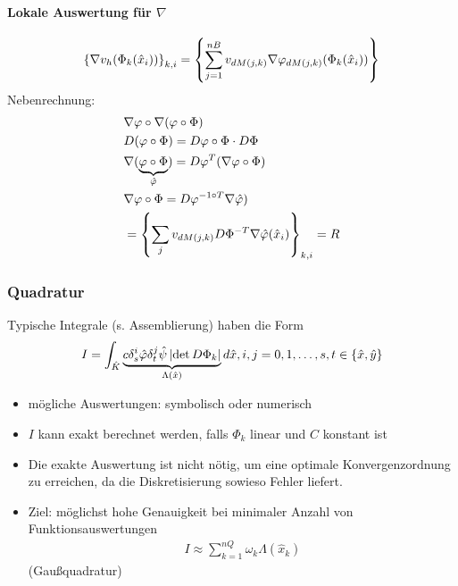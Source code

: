 \paragraph{Lokale Auswertung für $\nabla$}
\begin{align*}
  \left\{ \nabla v_{h}( \Phi_{k}( \hat x_{i})) \right\}_{k, i} = \left\{ \sum_{j = 1}^{nB} v_{dM(j, k)} \nabla \varphi_{dM(j, k)}(\Phi_{k}(\hat x_{i})) \right\}
\end{align*}
Nebenrechnung:
\begin{align*}
&\nabla \varphi \circ \nabla (\varphi \circ \Phi)  \\
&D(\varphi \circ \Phi) = D\varphi \circ \Phi \cdot D\Phi\\
&\nabla(\underbrace{\varphi \circ \Phi}_{\hat {\varphi}}) = D\varphi^{T} (\nabla \varphi \circ \Phi)\\
&\nabla\varphi \circ \Phi = D\varphi^{-1 \circ T} \nabla \hat {\varphi})\\
&= \left\{ \sum_{j} v_{dM(j, k)} D \Phi^{-T} \nabla \hat {\varphi}(\hat x_{i}) \right\}_{k, i} = R
\end{align*}
\subsubsection{Quadratur}
Typische Integrale (s. Assemblierung) haben die Form 
\begin{align*}
  I = \int_{\hat K} \underbrace{c \delta_{s}^{i} \hat {\varphi} \delta_{t}^{j} \hat\psi \left|\det D \Phi_{k}\right|}_{\Lambda(\hat x)} d \hat x, i, j = 0, 1, \dots, s, t \in \left\{ \hat x, \hat y \right\}
\end{align*}
\begin{itemize}
\item mögliche Auswertungen: symbolisch oder numerisch
\item $I$ kann exakt berechnet werden, falls $\Phi_{k}$ linear und $C$ konstant ist 
\item Die exakte Auswertung ist nicht nötig, um eine optimale Konvergenzordnung zu erreichen, da die Diskretisierung sowieso Fehler liefert. 
\item Ziel: möglichst hohe Genauigkeit bei minimaler Anzahl von Funktionsauswertungen
  \begin{align*}
    I \approx \sum_{k = 1}^{nQ}\omega_{k} \Lambda(\hat x_{k})
  \end{align*}
(Gaußquadratur)
\end{itemize}
